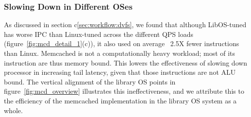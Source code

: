 
\subsubsection{Slowing Down in Different OSes} 
\label{sec:mcd:slowinos}
As discussed in section c\ref{sec:workflow:dvfs}, we found that although LibOS-tuned has worse IPC than Linux-tuned across the different QPS loads (figure~\ref{fig:mcd_detail_1}(c)), it also used on average ~2.5X fewer instructions than Linux. Memcached is not a computationally heavy workload; most of its instruction are thus memory bound.
This lowers the effectiveness of slowing down processor in increasing tail latency, given that those instructions are not ALU bound.
The vertical alignment of the library OS points in figure~\ref{fig:mcd_overview} illustrates this ineffectiveness, and we attribute this to the efficiency of the memcached implementation in the library OS system as a whole.

